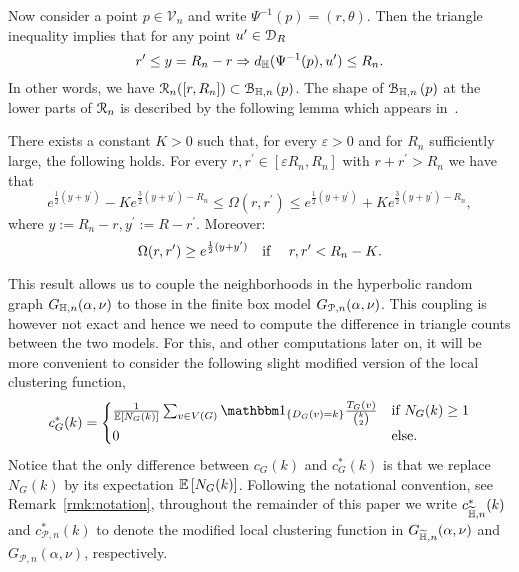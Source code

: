 Now consider a point $p \in \mathcal{V}_n$ and write $\Psi^{-1}(p) = (r,\theta)$. Then the triangle inequality implies that
for any point $u^\prime \in {\mathcal D}_R$
\begin{equation}\label{eq:tail_inclusion_hyperbolic_ball}
	r^\prime \leq y = R_n - r \Rightarrow d_{\mathbb{H}} (\Psi^{-1}(p),u^\prime) \leq R_n.
\end{equation}
In other words, we have ${\mathcal R}_n ([r, R_n])  \subset {\mathcal B}_{\mathbb{H},n}\left(p\right)$. The shape of ${\mathcal B}_{\mathbb{H},n}\left(p\right)$ at the lower parts of ${\mathcal R}_n$ is described by the following lemma which appears in~\cite{fountoulakis2018law}. 


\begin{lemma}\label{lem:asymptotics_Omega_hyperbolic}
There exists a constant $K>0$ such that, for every $\varepsilon > 0$ and for $R_n$ sufficiently large, the following holds.
For every $r,r^\prime \in [\varepsilon R_n,R_n]$ with $r + r^\prime > R_n$ we have that 
\begin{equation}\label{eq:asymp1}
	e^{\frac{1}{2}(y+y^\prime)} - K e^{\frac{3}{2}(y+y^\prime) - R_n} \leq \Omega(r, r^\prime) 
	\leq  e^{\frac{1}{2}(y+y^\prime)} + K e^{\frac{3}{2}(y+y^\prime) - R_n},
\end{equation}
where $y := R_n - r, y^\prime := R - r^\prime$. 
Moreover:
\begin{equation}\label{eq:asymp2} 
\Omega(r,r^\prime) \geq e^{\frac12(y+y^\prime)} \quad \text{if \quad $r, r^\prime < R_n - K$.} 
\end{equation}
\end{lemma}

This result allows us to couple the neighborhoods in the hyperbolic random graph $G_{\mathbb{H},n}(\alpha,\nu)$ to those in the finite box model $G_{{\mathcal P},n}(\alpha,\nu)$. This coupling is however not exact and hence we need to compute the difference in triangle counts between the two models. For this, and other computations later on, it will be more convenient to consider the following slight modified version of the local clustering function,
\begin{equation}\label{eq:def_local_clustering_ast_general}
	c_{G}^\ast(k) = \begin{cases}
			\frac{1}{\Exp{N_G(k)}} \sum_{v \in V(G)} \ind{D_G(v) = k} \frac{\T_G(v)}{\binom{k}{2}} &\mbox{if } N_G(k) \ge 1\\
			0 &\mbox{else.}
		\end{cases}
\end{equation}
Notice that the only difference between $c_G(k)$ and $c_G^\ast(k)$ is that we replace $N_G(k)$ by its expectation $\mathbb{E}\left[N_G(k)\right]$. Following the notational convention, see Remark~\ref{rmk:notation}, throughout the remainder of this paper we write $c_{\widetilde{\mathbb{H}},n}^\ast(k)$ and $c_{\mathcal{P},n}^\ast(k)$ to denote the modified local clustering function in $G_{\widetilde{\mathbb{H}},n}(\alpha, \nu)$ and $G_{\mathcal{P},n}(\alpha,\nu)$, respectively.

